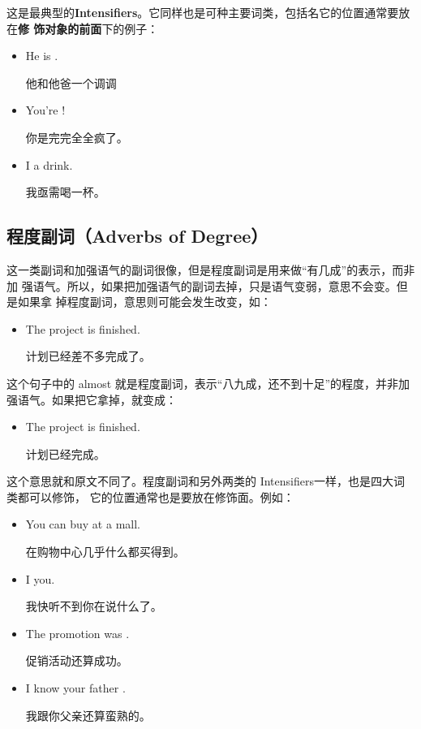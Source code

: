 这是最典型的\textbf{Intensifiers}。它同样也是可种主要词类，包括名它的位置通常要放在\textbf{修
  饰对象的前面}下的例子：
\begin{itemize}
\item He is  .

  他和他爸一个调调
\item You're  !

  你是完完全全疯了。
\item  I   a drink.

  我亟需喝一杯。
\end{itemize}

\subsection{程度副词（Adverbs of Degree）}

这一类副词和加强语气的副词很像，但是程度副词是用来做“有几成”的表示，而非加
强语气。所以，如果把加强语气的副词去掉，只是语气变弱，意思不会变。但是如果拿
掉程度副词，意思则可能会发生改变，如：
\begin{itemize}
\item  The project is  finished.

  计划已经差不多完成了。
\end{itemize}
这个句子中的 almost
就是程度副词，表示“八九成，还不到十足”的程度，并非加强语气。如果把它拿掉，就变成：
\begin{itemize}
\item  The project is finished.

  计划已经完成。
\end{itemize}
这个意思就和原文不同了。程度副词和另外两类的 Intensifiers一样，也是四大词类都可以修饰，
它的位置通常也是要放在修饰面。例如：
\begin{itemize}
\item You can buy   at a mall.

  在购物中心几乎什么都买得到。
\item I    you.

  我快听不到你在说什么了。
\item The promotion was   .

  促销活动还算成功。
\item I know your father  .

  我跟你父亲还算蛮熟的。
\end{itemize}

